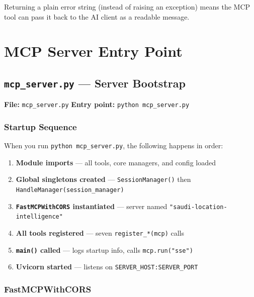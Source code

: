 \documentclass[12pt,a4paper]{report}
\begin{document}
Returning a plain error string (instead of raising an exception) means the
MCP tool can pass it back to the AI client as a readable message.

\chapter{MCP Server Entry Point}

\section{\texttt{mcp\_server.py} --- Server Bootstrap}

\begin{mdframed}[style=filebox]
\textbf{File:} \texttt{mcp\_server.py} \quad \textbf{Entry point:} \texttt{python mcp\_server.py}
\end{mdframed}

\subsection{Startup Sequence}

When you run \texttt{python mcp\_server.py}, the following happens in order:

\begin{enumerate}[noitemsep]
  \item \textbf{Module imports} --- all tools, core managers, and config loaded
  \item \textbf{Global singletons created} --- \texttt{SessionManager()} then \texttt{HandleManager(session\_manager)}
  \item \textbf{\texttt{FastMCPWithCORS} instantiated} --- server named \texttt{"saudi-location-intelligence"}
  \item \textbf{All tools registered} --- seven \texttt{register\_*(mcp)} calls
  \item \textbf{\texttt{main()} called} --- logs startup info, calls \texttt{mcp.run("sse")}
  \item \textbf{Uvicorn started} --- listens on \texttt{SERVER\_HOST:SERVER\_PORT}
\end{enumerate}

\subsection{FastMCPWithCORS}
\end{document}
